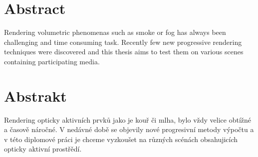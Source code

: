 \section*{Abstract}
\indent\indent 
Rendering volumetric phenomenas such as smoke or fog has always been challenging and time consuming task. Recently few new progressive rendering techniques were discovered and this thesis aims to test them on various scenes containing participating media. 

\section*{Abstrakt}\label{abstract}
\indent\indent 
Rendering opticky aktivních prvků jako je kouř či mlha, bylo vždy velice obtížné a časově náročné. V nedávné době se objevily nové progresivní metody výpočtu a v této diplomové práci je chceme vyzkoušet na různých scénách obsahujicích opticky aktivní prostřědí.

